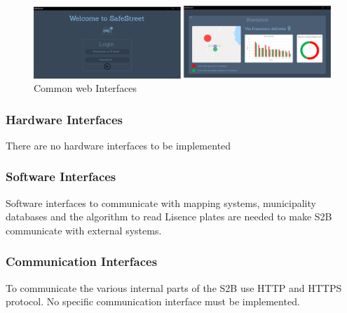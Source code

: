 \begin{figure}[h]
\centering
\includegraphics[width=\textwidth]{Images/desktop_common_interface.png}
\caption{\label{fig:ComWI}Common web Interfaces}
\end{figure}

\subsubsection{Hardware Interfaces}
There are no hardware interfaces to be implemented
\subsubsection{Software Interfaces}
Software interfaces to communicate with mapping systems, municipality databases and the algorithm to read Lisence plates are needed to make S2B communicate with external systems.
\subsubsection{Communication Interfaces }
To communicate the various internal parts of the S2B use HTTP and HTTPS protocol. No specific communication interface must be implemented.
